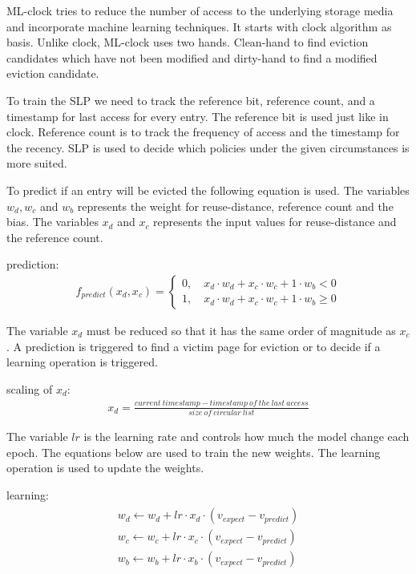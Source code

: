 \documentclass[
	12pt,
	a4paper,
	abstract,
	bibliography=totoc,
	chapterprefix,
	headings=openright,
	numbers=endperiod,
	parskip=half,
	twoside,
]{scrreprt}
\begin{document}
ML-clock tries to reduce the number of access to the underlying storage media and incorporate machine learning techniques.
It starts with clock algorithm as basis. 
Unlike clock, ML-clock uses two hands.
Clean-hand to find eviction candidates which have not been modified and dirty-hand to find a modified eviction candidate.

To train the SLP we need to track the reference bit, reference count, and a timestamp for last access for every entry.
The reference bit is used just like in clock.
Reference count is to track the frequency of access and the timestamp for the recency.
SLP is used to decide which policies under the given circumstances is more suited.

To predict if an entry will be evicted the following equation is used.
The variables $w_d, w_c$ and $w_b$ represents the weight for reuse-distance, reference count and the bias.
The variables $x_d$ and $x_c$ represents the input values for reuse-distance and the reference count.

prediction: \\
\begin{align}
	f_{predict} (x_d, x_c) =
	\begin{cases}
		0, \quad x_d \cdot w_d + x_c \cdot w_c + 1 \cdot w_b < 0 \\
		1, \quad x_d \cdot w_d + x_c \cdot w_c + 1 \cdot w_b \geq 0
	\end{cases}
\end{align}

The variable $x_d$ must be reduced so that it has the same order of magnitude as $x_c$.
A prediction is triggered to find a victim page for eviction or to decide if a learning operation is triggered.

scaling of $x_d$:
\begin{align}
	x_d = \frac{current \  timestamp - timestamp \  of \  the \  last \  access}{size \  of \  circular \  list}
\end{align}
	
The variable $lr$ is the learning rate and controls how much the model change each epoch.
The equations below are used to train the new weights.
The learning operation is used to update the weights.

learning:
\begin{align}
\begin{split}
	w_d \leftarrow w_d + lr \cdot x_d \cdot (v_{expect} - v_{predict})\\
	w_c \leftarrow w_c + lr \cdot x_c \cdot (v_{expect} - v_{predict})\\
	w_b \leftarrow w_b + lr \cdot x_b \cdot (v_{expect} - v_{predict})
\end{split}
\end{align}
\end{document}
